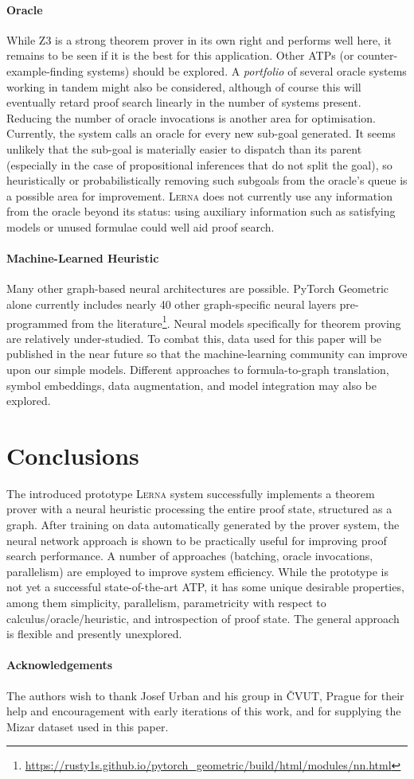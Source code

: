 \documentclass{llncs}
\newcommand{\lerna}{\textsc{Lerna}}
\newcommand{\z}[1]{\textsc{Z3}}
\begin{document}
\paragraph{Oracle}
While \z3 is a strong theorem prover in its own right and performs well here, it remains to be seen if it is the best for this application.
Other ATPs (or counter-example-finding systems) should be explored. 
A \emph{portfolio} of several oracle systems working in tandem might also be considered, although of course this will eventually retard proof search linearly in the number of systems present.
Reducing the number of oracle invocations is another area for optimisation.
Currently, the system calls an oracle for every new sub-goal generated.
It seems unlikely that the sub-goal is materially easier to dispatch than its parent (especially in the case of propositional inferences that do not split the goal), so heuristically or probabilistically removing such subgoals from the oracle's queue is a possible area for improvement.
\lerna{} does not currently use any information from the oracle beyond its status: using auxiliary information such as satisfying models or unused formulae could well aid proof search.

\paragraph{Machine-Learned Heuristic}
Many other graph-based neural architectures are possible.
PyTorch Geometric alone currently includes nearly 40 other graph-specific neural layers pre-programmed from the literature\footnote{\url{https://rusty1s.github.io/pytorch_geometric/build/html/modules/nn.html}}.
Neural models specifically for theorem proving are relatively under-studied.
To combat this, data used for this paper will be published in the near future so that the machine-learning community can improve upon our simple models.
Different approaches to formula-to-graph translation, symbol embeddings, data augmentation, and model integration may also be explored.

\section{Conclusions}
The introduced prototype \lerna{} system successfully implements a theorem prover with a neural heuristic processing the entire proof state, structured as a graph.
After training on data automatically generated by the prover system, the neural network approach is shown to be practically useful for improving proof search performance.
A number of approaches (batching, oracle invocations, parallelism) are employed to improve system efficiency.
While the prototype is not yet a successful state-of-the-art ATP, it has some unique desirable properties, among them simplicity, parallelism, parametricity with respect to calculus/oracle/heuristic, and introspection of proof state.
The general approach is flexible and presently unexplored.

\paragraph{Acknowledgements}
The authors wish to thank Josef Urban and his group in \v{C}VUT, Prague for their help and encouragement with early iterations of this work, and for supplying the Mizar dataset used in this paper.



\end{document}
